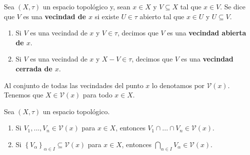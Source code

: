 \documentclass[12pt]{report}
\theoremstyle{largebreak}
\begin{document}
    \begin{mydef}
        Sea $(X,\tau)$ un espacio topológico y, sean $x\in X$ y $V\subseteq X$ tal que $x\in V$. Se dice que $V$ es una \textbf{vecindad de $x$} si existe $U\in\tau$ abierto tal que $x\in U$ y $U\subseteq V$.
        \begin{enumerate}
            \item Si $V$ es una vecindad de $x$ y $V\in\tau$, decimos que $V$ es una \textbf{vecindad abierta de $x$}.
            \item Si $V$ es una vecindad de $x$ y $X-V\in\tau$, decimos que $V$ es una \textbf{vecindad cerrada de $x$}.
        \end{enumerate}
        Al conjunto de todas las vecindades del punto $x$ lo denotamos por $\mathcal{V}(x)$. Tenemos que $X\in\mathcal{V}(x)$ para todo $x\in X$.
    \end{mydef}

    \begin{excer}
        Sea $(X,\tau)$ un espacio topológico.
        \begin{enumerate}
            \item Si $V_1,...,V_n\in\mathcal{V}(x)$ para $x\in X$, entonces $V_1\cap...\cap V_n\in\mathcal{V}(x)$.
            \item Si $\left\{V_\alpha\right\}_{\alpha\in I}\subseteq\mathcal{V}(x)$ para $x\in X$, entonces $\bigcap_{\alpha\in I}V_\alpha\in\mathcal{V}(x)$.
        \end{enumerate}
    \end{excer}

    \begin{sol}
        
    \end{sol}
\end{document}
